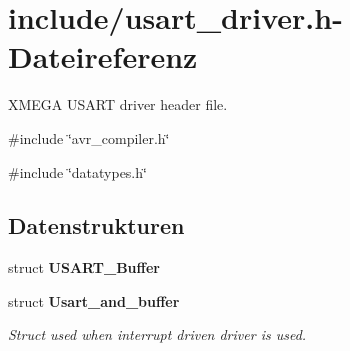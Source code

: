 \section{include/usart\_\-driver.h-\/Dateireferenz}
\label{usart__driver_8h}


XMEGA USART driver header file.  


{\ttfamily \#include \char`\"{}avr\_\-compiler.h\char`\"{}}\par
{\ttfamily \#include \char`\"{}datatypes.h\char`\"{}}\par
\subsection*{Datenstrukturen}
\begin{DoxyCompactItemize}
\item 
struct {\bf USART\_\-Buffer}
\item 
struct {\bf Usart\_\-and\_\-buffer}
\begin{DoxyCompactList}\small\item\em Struct used when interrupt driven driver is used. \item\end{DoxyCompactList}\end{DoxyCompactItemize}
